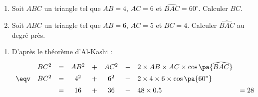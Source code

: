 \begin{methode}
	\nline
	\begin{enumerate}
		\item Soit $ABC$ un triangle tel que $AB = 4$, $AC = 6$ et $\widehat{BAC} = 60^\circ$. Calculer $BC$.
		\item Soit $ABC$ un triangle tel que $AB = 6$, $AC = 5$ et $BC = 4$. Calculer $\widehat{BAC}$ au degré près.
	\end{enumerate}

	\begin{correction}
		\nline
		\begin{enumerate}
			\item D'après le théorème d'Al-Kashi :
			      \[
				      \def\arraystretch{1.4}
				      \begin{array}{rccccccll}
					           & BC^2 & = & AB^2 & + & AC^2 & - & 2 \times AB \times AC \times \cos\pa{\widehat{BAC}} &      \\
					      \eqv & BC^2 & = & 4^2  & + & 6^2  & - & 2 \times 4 \times 6 \times \cos\pa{60^\circ}        &      \\
					           &      & = & 16   & + & 36   & - & 48 \times 0.5                                       & = 28
				      \end{array}
			      \]


\end{enumerate}
\end{correction}
\end{methode}
